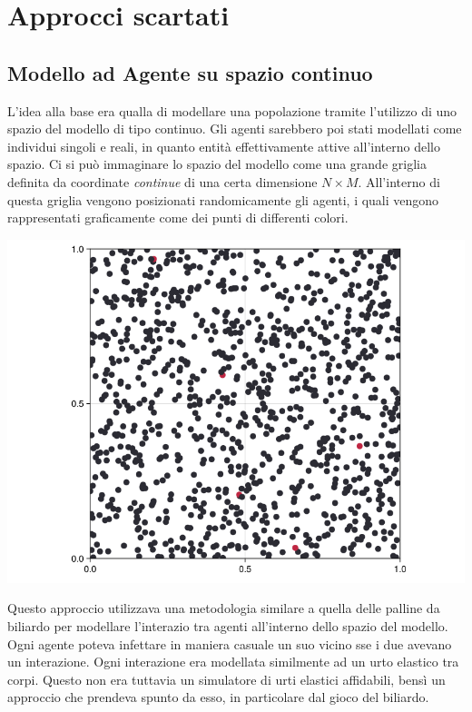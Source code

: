 \section{Approcci scartati}

\subsection{Modello ad Agente su spazio continuo}
L'idea alla base era qualla di modellare una popolazione tramite l'utilizzo di 
uno spazio del modello di tipo continuo. Gli agenti sarebbero poi stati modellati come 
individui singoli e reali, in quanto entità effettivamente attive all'interno 
dello spazio. Ci si può immaginare lo spazio del modello come una grande griglia 
definita da coordinate \emph{continue} di una certa dimensione \emph{$N \times M$}. All'interno 
di questa griglia vengono posizionati randomicamente gli agenti, i quali vengono 
rappresentati graficamente come dei punti di differenti colori.

\begin{minipage}{\linewidth}
    \centering
    \includegraphics[width=\textwidth]{img/ball-covid.png}
    \label{fig:ball_covid}
\end{minipage}

Questo approccio utilizzava una metodologia similare a quella delle palline da biliardo 
per modellare l'interazio tra agenti all'interno dello spazio del modello. Ogni agente poteva
infettare in maniera casuale un suo vicino sse i due avevano un interazione. Ogni interazione
era modellata similmente ad un urto elastico \cite{wiki:Urto_elastico} tra corpi. 
Questo non era tuttavia un simulatore di urti elastici affidabili, bensì un approccio che prendeva
spunto da esso, in particolare dal gioco del biliardo. 


